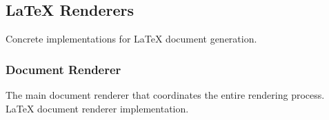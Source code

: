\documentclass[letterpaper,10pt,english]{sphinxmanual}
\begin{document}
\subsection{LaTeX Renderers}
\label{\detokenize{api/renderers:latex-renderers}}
\sphinxAtStartPar
Concrete implementations for LaTeX document generation.


\subsubsection{Document Renderer}
\label{\detokenize{api/renderers:document-renderer}}
\sphinxAtStartPar
The main document renderer that coordinates the entire rendering process.
\label{\detokenize{api/renderers:module-src.renderers.latex.document}}
\sphinxAtStartPar
LaTeX document renderer implementation.
\end{document}
